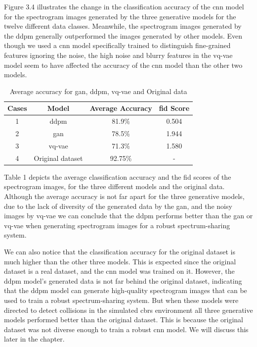     Figure 3.4 illustrates the change in the classification accuracy of the \gls{cnn} model for the spectrogram images generated by the three generative models for the twelve different data classes. Meanwhile, the spectrogram images generated by the \gls{ddpm} generally outperformed the images generated by other models. Even though we used a \gls{cnn} model specifically trained to distinguish fine-grained features ignoring the noise, the high noise and blurry features in the \gls{vq-vae} model seem to have affected the accuracy of the \gls{cnn} model than the other two models. 
    
    
    \begin{table}[h!]
        \centering
        \begin{tabular}{c c c c}
            \hline
            Cases & Model & Average Accuracy & \gls{fid} Score \\
            \hline
            1 & \gls{ddpm} & 81.9\% & 0.504\\
            \hline
            2 & \gls{gan} & 78.5\% & 1.944\\
            \hline
            3 & \gls{vq-vae} & 71.3\%  & 1.580\\
            \hline
            4 & Original dataset & 92.75\%  & - \\
            \hline
        \end{tabular}
        \caption{Average accuracy for \gls{gan}, \gls{ddpm}, \gls{vq-vae} and Original data}
        \label{tab:average_accuracy}
    \end{table}
    
    Table 1 depicts the average classification accuracy and the \gls{fid} scores of the spectrogram images, for the three different models and the original data.
    Although the average accuracy is not far apart for the three generative models, due to the lack of diversity of the generated data by the \gls{gan}, and the noisy images by \gls{vq-vae} we can conclude that the \gls{ddpm} performs better than the \gls{gan} or \gls{vq-vae} when generating spectrogram images for a robust spectrum-sharing system.
    
    We can also notice that the classification accuracy for the original dataset is much higher than the other three models. This is expected since the original dataset is a real dataset, and the \gls{cnn}  model was trained on it. However, the \gls{ddpm} model's generated data is not far behind the original dataset, indicating that the \gls{ddpm} 
    model can generate high-quality spectrogram images that can be used to train a robust spectrum-sharing system. But when these models were directed to detect collisions in the simulated \gls{cbrs} environment all three generative models performed better than the original dataset. This is because the original dataset was not diverse enough to train a robust \gls{cnn} model.
    We will discuss this later in the chapter.
    
